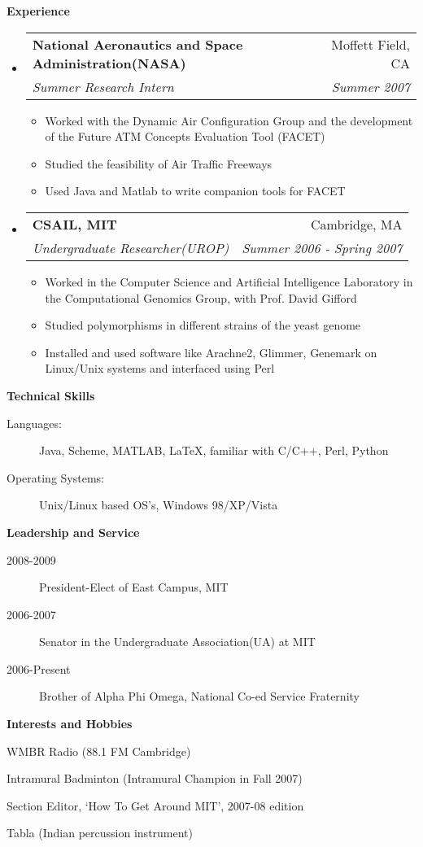 \documentclass[letterpaper,11pt]{article}
\makeatletter
\newcommand{\resitem}[1]{\item #1 \vspace{-2pt}}
\newcommand{\resheading}[1]{{\large \colorbox{mygrey}{\begin{minipage}{\textwidth}{\textbf{#1 \vphantom{p\^{E}}}}\end{minipage}}}}
\newcommand{\ressubheading}[4]{
\begin{tabular*}{6.5in}{l@{\extracolsep{\fill}}r}
		\textbf{#1} & #2 \\
		\textit{#3} & \textit{#4} \\
\end{tabular*}\vspace{-6pt}}
\makeatother
\begin{document}
\resheading{Experience}
\begin{itemize}
\item
	\ressubheading{National Aeronautics and Space Administration(NASA)}{Moffett Field, CA}{Summer Research Intern}{Summer 2007}
	\begin{itemize}
		\resitem{Worked with the Dynamic Air Configuration Group and the development of the Future ATM Concepts Evaluation Tool (FACET)}
		\resitem{Studied the feasibility of Air Traffic Freeways}
		\resitem{Used Java and Matlab to write companion tools for FACET}
	\end{itemize}
\item
	\ressubheading{CSAIL, MIT}{Cambridge, MA}{Undergraduate Researcher(UROP)}{Summer 2006 - Spring 2007}
	\begin{itemize}
		\resitem{Worked in the Computer Science and Artificial Intelligence Laboratory in the Computational Genomics Group, with Prof. David Gifford}
		\resitem{Studied polymorphisms in different strains of the yeast genome}
		\resitem{Installed and used software like Arachne2, Glimmer, Genemark on Linux/Unix systems and interfaced using Perl}
	\end{itemize}
\end{itemize}

\resheading{Technical Skills}

\begin{description}
\item[Languages:]
Java, Scheme, MATLAB, \LaTeX, familiar with C/C++, Perl, Python
\item[Operating Systems:]
Unix/Linux based OS's, Windows 98/XP/Vista
\end{description}

\resheading{Leadership and Service}
\begin{description}
\item[2008-2009] President-Elect of East Campus, MIT
\item[2006-2007] Senator in the Undergraduate Association(UA) at MIT
\item[2006-Present] Brother of Alpha Phi Omega, National Co-ed Service Fraternity
\end{description}

\resheading{Interests and Hobbies}
\begin{description}
\item WMBR Radio (88.1 FM Cambridge)
\item Intramural Badminton (Intramural Champion in Fall 2007)
\item Section Editor, `How To Get Around MIT', 2007-08 edition
\item Tabla (Indian percussion instrument)
\end{description}
\end{document}
